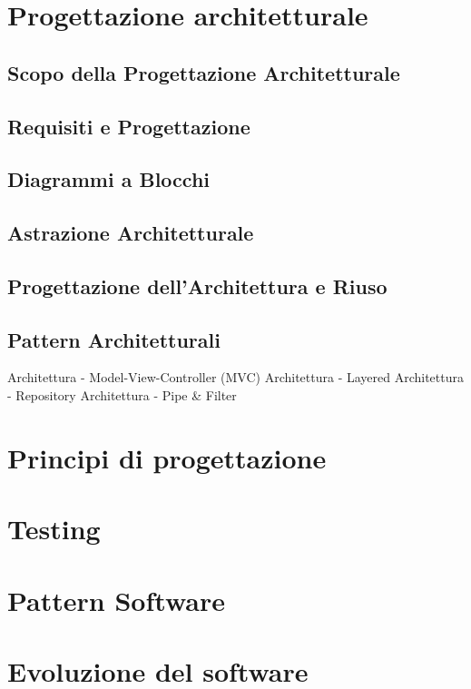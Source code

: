 \documentclass{article}
\begin{document}
	\section{Progettazione architetturale}
	\subsection{Scopo della Progettazione Architetturale}
	\subsection{Requisiti e Progettazione}
	\subsection{Diagrammi a Blocchi}
	\subsection{Astrazione Architetturale}
	\subsection{Progettazione dell’Architettura e Riuso}
	\subsection{Pattern Architetturali}
	Architettura - Model-View-Controller (MVC)
	Architettura - Layered
	Architettura - Repository
	Architettura - Pipe \& Filter
	
	\section{Principi di progettazione}
	\section{Testing}
	\section{Pattern Software}
	\section{Evoluzione del software}
\end{document}
